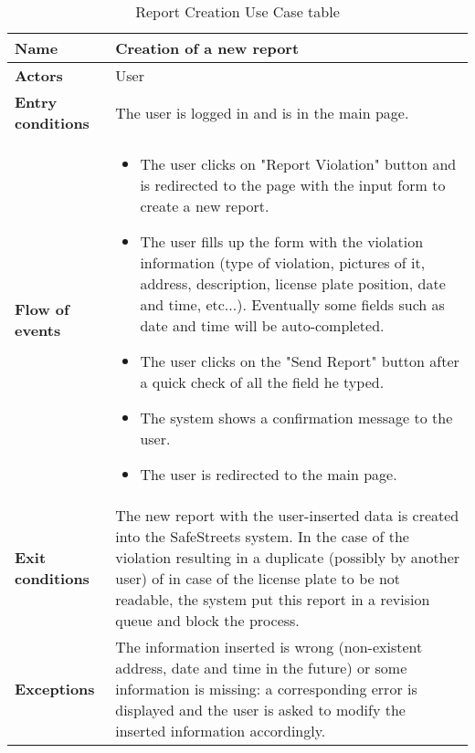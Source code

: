 \begin{table}[!htbp]
	\hypertarget{tab:reportcreationtab}{}
	\centering
	\begin{tabular}{lp{9cm}}
\bf\large Name&\bf\large Creation of a new report\\
\hline
\hline
\bf Actors&User\\
\hline
\bf Entry conditions&The user is logged in and is in the main page.\\
\hline
\bf Flow of events&
\begin{itemize}

\item The user clicks on "Report Violation" button and is redirected to the page with the input form to create a new report.

\item The user fills up the form with the violation information (type of violation, pictures of it, address, description, license plate position, date and time, etc...). Eventually some fields such as date and time will be auto-completed.

\item The user clicks on the "Send Report" button after a quick check of all the field he typed.

\item The system shows a confirmation message to the user. 

\item The user is redirected to the main page.

\end{itemize}
\\
\hline
\bf Exit conditions&The new report with the user-inserted data is created into the SafeStreets system. In the case of the violation resulting in a duplicate (possibly by another user) of in case of the license plate to be not readable, the system put this report in a revision queue and block the process.\\
\hline
\bf Exceptions&The information inserted is wrong (non-existent address, date and time in the future) or some information is missing: a corresponding error is displayed and the user is asked to modify the inserted information accordingly.
\\
\hline

\end{tabular}
\caption{Report Creation Use Case table}
 \label{tab:reportcreationtab}
\end{table}